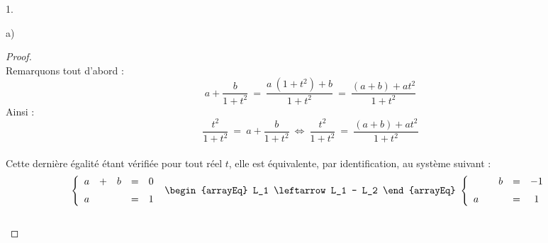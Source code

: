 \documentclass[11pt]{article}%
\begin{document}
\begin{noliste}{1.}
\begin{noliste}{a)}
    \begin{proof}~\\%
      Remarquons tout d'abord :
        \[
        a + \dfrac{b}{1 + t^2} \ = \ \dfrac{a \ (1 + t^2) + b}{1 +
          t^2} \ = \ \dfrac{(a+b) + a t^2}{1 + t^2}
        \]
        Ainsi :
        \[
        \dfrac{t^2}{1 + t^2} \ = \ a + \dfrac{b}{1 + t^2} \
        \Leftrightarrow \ \dfrac{t^2}{1 + t^2} \ = \ \dfrac{(a+b) + a
          t^2}{1 + t^2}
        \]~\\
        Cette dernière égalité étant vérifiée pour tout réel $t$, elle
        est équivalente, par identification, au système suivant :
        \[
        \left\{
          \begin{array}{ccccc}
            a & + & b & = & 0
            \\[.2cm]
            a & & & = & 1
          \end{array}
        \right. %
        \
        \begin{arrayEq}
          L_1 \leftarrow L_1 - L_2
        \end{arrayEq}
        \ %
        \left\{
          \begin{array}{ccccc}
            & & b & = & -1
            \\[.2cm]
            a & & & = & 1
          \end{array}
        \right.
        \]
        ~\\[-.8cm]
    \end{proof}


\end{noliste}
\end{noliste}
\end{document}
